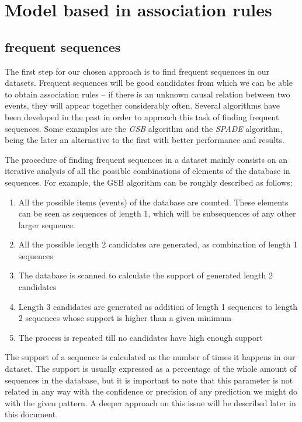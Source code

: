 \documentclass[a4paper,12pt]{article}
\begin{document}
\section{Model based in association rules}

\subsection{frequent sequences}\label{sec:mining_sequences}
The first step for our chosen approach is to find frequent sequences in our datasets. Frequent sequences will be good candidates from which we can be able to obtain association rules -- if there is an unknown causal relation between two events, they will appear together considerably often. Several algorithms have been developed in the past in order to approach this task of finding frequent sequences. Some examples are the \emph{GSB} algorithm and the \emph{SPADE} algorithm, being the later an alternative to the first with better performance and results.

The procedure of finding frequent sequences in a dataset mainly consists on an iterative analysis of all the possible combinations of elements of the database in sequences. For example, the GSB algorithm can be roughly described as follows:

\begin{enumerate}
\item All the possible items (events) of the database are counted. These elements can be seen as sequences of length 1, which will be subsequences of any other larger sequence.
\item All the possible length 2 candidates are generated, as combination of length 1 sequences
\item The database is scanned to calculate the support of generated length 2 candidates
\item Length 3 candidates are generated as addition of length 1 sequences to length 2 sequences whose support is higher than a given minimum
\item The process is repeated till no candidates have high enough support
\end{enumerate}

The support of a sequence is calculated as the number of times it happens in our dataset. The support is usually expressed as a percentage of the whole amount of sequences in the database, but it is important to note that this parameter is not related in any way with the confidence or precision of any prediction we might do with the given pattern. A deeper approach on this issue will be described later in this document.
\end{document}
